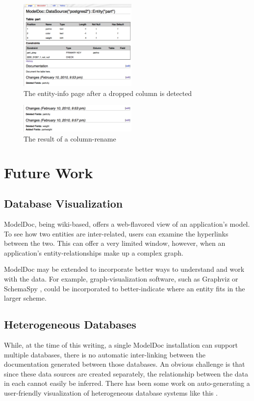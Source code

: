 \documentclass{acm_proc_article-sp}
\begin{document}
\begin{figure}[h]
\centering
\includegraphics[width=220px]{drop-column.pdf}
\caption{The entity-info page after a dropped column is detected}
\end{figure}

\begin{figure}[h]
\centering
\includegraphics[width=220px]{rename.pdf}
\caption{The result of a column-rename}
\end{figure}

\section{Future Work}

\subsection{Database Visualization}

ModelDoc, being wiki-based, offers a web-flavored view of an application's
model.  To see how two entities are inter-related, users can examine the
hyperlinks between the two.  This can offer a very limited window, however,
when an application's entity-relationships make up a complex graph.

ModelDoc may be extended to incorporate better ways to understand and work with
the data.  For example, graph-visualization software, such as Graphviz
\cite{web:graphviz} or SchemaSpy \cite{web:schemaspy}, could be incorporated to
better-indicate where an entity fits in the larger scheme.

\subsection{Heterogeneous Databases}

While, at the time of this writing, a single ModelDoc installation can support
multiple databases, there is no automatic inter-linking between the
documentation generated between those databases.  An obvious challenge is that
since these data sources are created separately, the relationship between the
data in each cannot easily be inferred.  There has been
some work on auto-generating a user-friendly visualization of heterogeneous
database systems like this \cite{catarci:heterogeneous}.
\end{document}
